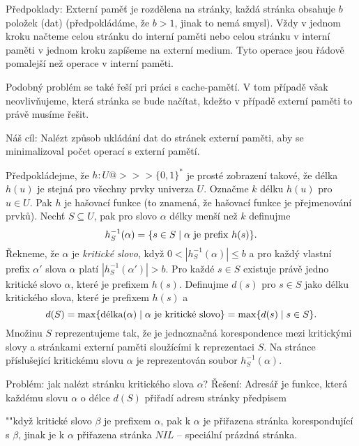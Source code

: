 \documentclass[a4paper,12pt]{article}
\begin{document}
Předpoklady:  Externí pamě\v t je rozdělena na 
stránky, každá stránka obsahuje $b$ položek (dat) 
(předpokládáme, že $b>1$, jinak to nemá smysl).  Vždy v 
jednom kroku načteme celou stránku do interní paměti 
nebo celou stránku v interní paměti v jednom kroku 
zapíšeme na externí medium.  Tyto operace jsou řádově 
pomalejší než operace v interní paměti.  

Podobný problém se také řeší pri práci s cache-pamětí. V tom případě však 
neovlivňujeme, která stránka se bude načítat, kdežto v případě externí paměti to právě musíme řešit.

Náš cíl:  
Nalézt způsob ukládání dat do stránek externí 
paměti, aby se minimalizoval počet operací s externí 
pamětí.  

Předpokládejme, že $h:U@>>>\{0,1\}^{*}$ je prosté 
zobrazení takové, že délka $h(u)$ je stejná pro všechny prvky 
univerza $U$.  Označme $k$ délku $h(u)$ pro $u\in U$. Pak $
h$ je 
hašovací funkce (to znamená, že hašovací funkce je přejmenování prvků).  Nech\v t $S\subseteq U$, pak pro slovo $
\alpha$ délky 
menší než $k$ definujme 
$$h^{-1}_S(\alpha )=\{s\in S\mid\alpha\text{\rm\ je prefix }h(s)\}
.$$
Řekneme, že $\alpha$ je \emph{kritické} \emph{slovo}, když 
$0<|h^{-1}_S(\alpha )|\le b$ a pro každý vlastní prefix $
\alpha'$ slova $\alpha$ platí 
$|h^{-1}_S(\alpha')|>b$.  Pro každé $s\in S$ existuje právě jedno 
kritické slovo $\alpha$, které je prefixem $h(s)$.  Definujme $
d(s)$ 
pro $s\in S$ jako délku kritického slova, které je prefixem 
$h(s)$ a 
$$d(S)=\max\{\text{\rm délka}(\alpha )\mid\alpha\text{\rm\ je kritické slovo}
\}=\max\{d(s)\mid s\in S\}.$$
Množinu $S$ reprezentujeme tak, že je jednoznačná 
korespondence mezi kritickými slovy a stránkami externí 
paměti slouží\-cí\-mi k reprezentaci $S$.  Na stránce 
příslušející kritickému slovu $\alpha$ je reprezentován soubor 
$h^{-1}_S(\alpha )$.  

Problém: jak nalézt stránku kritického slova 
$\alpha$?\newline 
Řešení: Adresář je funkce, která každému slovu $
\alpha$ o 
délce $d(S)$ přiřadí adresu stránky předpisem
\roster
\item"{}"když kritické slovo $\beta$ je prefixem $\alpha$, pak k $
\alpha$ je 
přiřazena strán\-ka korespondující s $\beta$, jinak je k $
\alpha$ 
přiřazena strán\-ka $NIL$ -- speciální prázdná stránka.
\endroster
\end{document}
